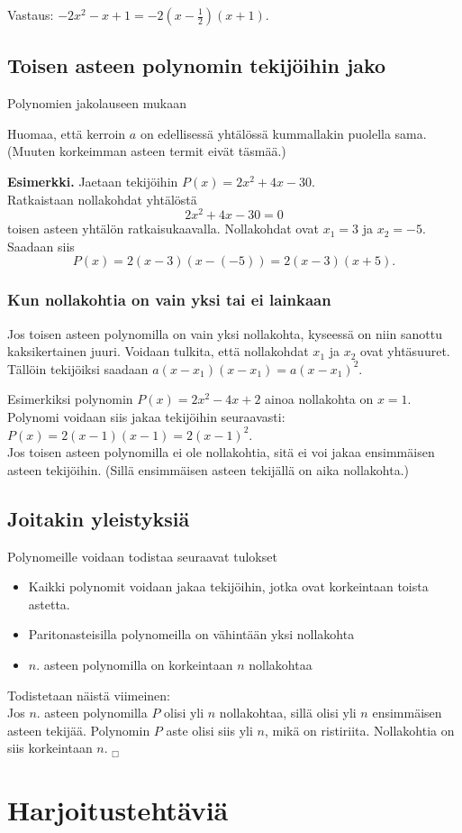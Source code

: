 Vastaus: $-2x^2-x+1 = -2(x-\frac{1}{2})(x+1)$.

\subsection*{Toisen asteen polynomin tekijöihin jako}

Polynomien jakolauseen mukaan

Huomaa, että kerroin $a$ on edellisessä yhtälössä kummallakin puolella sama.
(Muuten korkeimman asteen termit eivät täsmää.)

\textbf{Esimerkki.}
Jaetaan tekijöihin $P(x)=2x^2 + 4x-30$. \\
Ratkaistaan nollakohdat yhtälöstä $$2x^2 + 4x-30=0$$ toisen asteen yhtälön ratkaisukaavalla.
Nollakohdat ovat $x_1=3$ ja $x_2=-5$. Saadaan siis
$$P(x)= 2(x-3)(x-(-5)) = 2(x-3)(x+5).$$

\subsubsection*{Kun nollakohtia on vain yksi tai ei lainkaan}
Jos toisen asteen polynomilla on vain yksi nollakohta, kyseessä on niin sanottu kaksikertainen juuri. Voidaan tulkita, että nollakohdat $x_1$ ja $x_2$ ovat yhtäsuuret. Tällöin tekijöiksi saadaan $a(x-x_1)(x-x_1)=a(x-x_1)^2$.

Esimerkiksi polynomin $P(x)=2x^2-4x+2$ ainoa nollakohta on $x=1$. Polynomi voidaan siis jakaa tekijöihin seuraavasti: \\ $P(x)=2(x-1)(x-1)=2(x-1)^2$. \\

Jos toisen asteen polynomilla ei ole nollakohtia, sitä ei voi jakaa ensimmäisen asteen tekijöihin. (Sillä ensimmäisen asteen tekijällä on aika nollakohta.)

\subsection*{Joitakin yleistyksiä}

Polynomeille voidaan todistaa seuraavat tulokset
\begin{itemize}
\item Kaikki polynomit voidaan jakaa tekijöihin, jotka ovat korkeintaan toista astetta.
\item Paritonasteisilla polynomeilla on vähintään yksi nollakohta
\item $n$. asteen polynomilla on korkeintaan $n$ nollakohtaa
\end{itemize}
Todistetaan näistä viimeinen: \\
Jos $n$. asteen polynomilla $P$ olisi yli $n$ nollakohtaa, sillä olisi yli $n$ ensimmäisen asteen
tekijää. Polynomin $P$ aste olisi siis yli $n$, mikä on ristiriita. Nollakohtia on siis
korkeintaan $n$. $_\Box$


\section{Harjoitustehtäviä}
